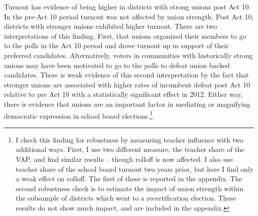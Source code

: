 Turnout has evidence of being higher in districts with strong unions post Act 10. 
In the pre-Act 10 period turnout was not affected by union strength. Post Act 10, 
districts with stronger unions exhibited higher turnout. There are two interpretations 
of this finding. First, that unions organized their members to go to the polls 
in the Act 10 period and drove turnout up in support of their preferred candidates. 
Alternatively, voters in communities with historically strong unions may have 
been motivated to go to the polls to defeat union backed candidates. 
There is weak evidence of this second interpretation by the fact that stronger 
unions are associated with higher rates of incumbent defeat post Act 10 relative 
to pre Act 10 with a statistically significant effect in 2012. Either way, 
there is evidence that unions are an important factor in mediating or 
magnifying democratic expression in school board elections.\footnote{I check 
this finding for robustness by measuring teacher influence with two additional 
ways. First, I use two different measure, the teacher share of the VAP, 
and find similar results -- though rolloff is now affected. I also use teacher 
share of the school board turnout two years prior, but here I find only a weak 
effect on rolloff. The first of these is reported in the appendix. The second 
robustness check is to estimate the impact of union strength within the subsample 
of districts which went to a recertification election. These results do not show 
much impact, and are included in the appendix.}

